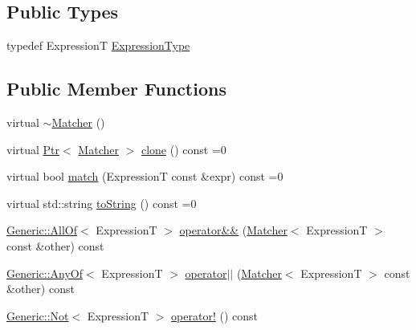 \subsection*{Public Types}
\begin{DoxyCompactItemize}
\item 
typedef ExpressionT \hyperlink{struct_catch_1_1_matchers_1_1_impl_1_1_matcher_a7f5068cbacd1eed06cf243e63446e7e1}{Expression\+Type}
\end{DoxyCompactItemize}
\subsection*{Public Member Functions}
\begin{DoxyCompactItemize}
\item 
virtual \hyperlink{struct_catch_1_1_matchers_1_1_impl_1_1_matcher_a55e537214a78bbba59f53d3e30336a61}{$\sim$\+Matcher} ()
\item 
virtual \hyperlink{class_catch_1_1_ptr}{Ptr}$<$ \hyperlink{struct_catch_1_1_matchers_1_1_impl_1_1_matcher}{Matcher} $>$ \hyperlink{struct_catch_1_1_matchers_1_1_impl_1_1_matcher_a9d31e5018fea24efa08c3cbf5aa4475d}{clone} () const =0
\item 
virtual bool \hyperlink{struct_catch_1_1_matchers_1_1_impl_1_1_matcher_a8c1c5511ce1f3738a45e6901b558f583}{match} (ExpressionT const \&expr) const =0
\item 
virtual std\+::string \hyperlink{struct_catch_1_1_matchers_1_1_impl_1_1_matcher_a091bcc37e589967d7e10fc7790d820e2}{to\+String} () const =0
\item 
\hyperlink{class_catch_1_1_matchers_1_1_impl_1_1_generic_1_1_all_of}{Generic\+::\+All\+Of}$<$ ExpressionT $>$ \hyperlink{struct_catch_1_1_matchers_1_1_impl_1_1_matcher_adb060f348e3ed404b80209fbc62174e1}{operator\&\&} (\hyperlink{struct_catch_1_1_matchers_1_1_impl_1_1_matcher}{Matcher}$<$ ExpressionT $>$ const \&other) const
\item 
\hyperlink{class_catch_1_1_matchers_1_1_impl_1_1_generic_1_1_any_of}{Generic\+::\+Any\+Of}$<$ ExpressionT $>$ \hyperlink{struct_catch_1_1_matchers_1_1_impl_1_1_matcher_a55b1e12315e7a5daf7ce7a11ddfaa295}{operator$\vert$$\vert$} (\hyperlink{struct_catch_1_1_matchers_1_1_impl_1_1_matcher}{Matcher}$<$ ExpressionT $>$ const \&other) const
\item 
\hyperlink{class_catch_1_1_matchers_1_1_impl_1_1_generic_1_1_not}{Generic\+::\+Not}$<$ ExpressionT $>$ \hyperlink{struct_catch_1_1_matchers_1_1_impl_1_1_matcher_a7ecd56842090611c9dbfc325b42fa942}{operator!} () const
\end{DoxyCompactItemize}
